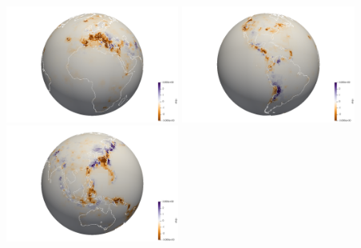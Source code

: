\begin{center}
\includegraphics[width=5.7cm]{python_codes/fieldstone_94/sphere1} 
\includegraphics[width=5.7cm]{python_codes/fieldstone_94/sphere2} 
\includegraphics[width=5.7cm]{python_codes/fieldstone_94/sphere3} 
\end{center}


